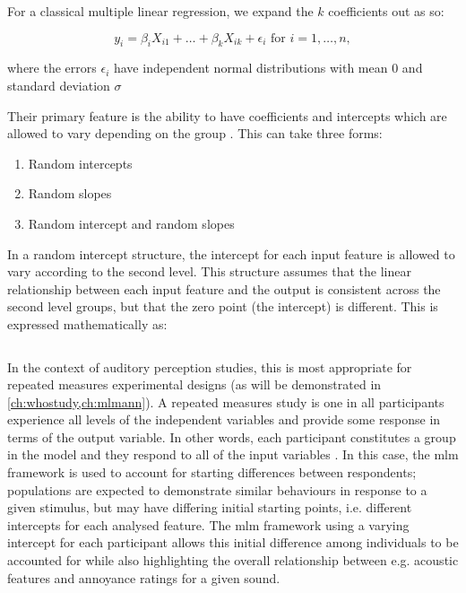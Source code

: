 For a classical multiple linear regression, we expand the $k$ coefficients out as so:

\begin{equation}
  y_i = \beta_i X_{i1} + \ldots + \beta_k X_{ik} + \epsilon_i \text{ for } i = 1, \ldots, n,
\end{equation}

where the errors $\epsilon_i$ have independent normal distributions with mean 0 and standard deviation $\sigma$

Their primary feature is the ability to have coefficients and intercepts which are allowed to vary depending on the group \citep{Gelman2006Multilevel}. This can take three forms:

\begin{enumerate}
  \item Random intercepts
  \item Random slopes
  \item Random intercept and random slopes
\end{enumerate}

In a random intercept structure, the intercept for each input feature is allowed to vary according to the second level. This structure assumes that the linear relationship between each input feature and the output is consistent across the second level groups, but that the zero point (the intercept) is different. This is expressed mathematically as:

\begin{equation}
\end{equation}

In the context of auditory perception studies, this is most appropriate for repeated measures experimental designs (as will be demonstrated in \cref{ch:whostudy,ch:mlmann}). A repeated measures study is one in all participants experience all levels of the independent variables and provide some response in terms of the output variable. In other words, each participant constitutes a group in the model and they respond to all of the input variables \citep{Kristjansson2007Multilevel}. In this case, the \gls{mlm} framework is used to account for starting differences between respondents; populations are expected to demonstrate similar behaviours in response to a given stimulus, but may have differing initial starting points, i.e. different intercepts for each analysed feature. The \gls{mlm} framework using a varying intercept for each participant allows this initial difference among individuals to be accounted for while also highlighting the overall relationship between e.g. acoustic features and annoyance ratings for a given sound. 

